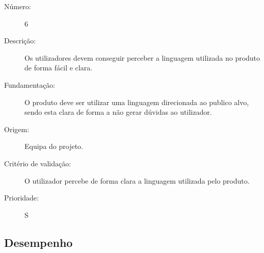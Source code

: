 \documentclass{article}
\begin{document}
      \vspace{0.5cm}
      \begin{description}
        \item[Número:]6
        \item[Descrição:]Os utilizadores devem conseguir perceber a linguagem utilizada no produto de forma fácil e clara.
        \item[Fundamentação:]O produto deve ser utilizar uma linguagem direcionada ao publico alvo, sendo esta clara de forma a não gerar dúvidas ao utilizador.
        \item[Origem:]Equipa do projeto.
        \item[Critério de validação:]O utilizador percebe de forma clara a linguagem utilizada pelo produto.
        \item[Prioridade:]S
      \end{description}

  \subsection{Desempenho}
\end{document}
